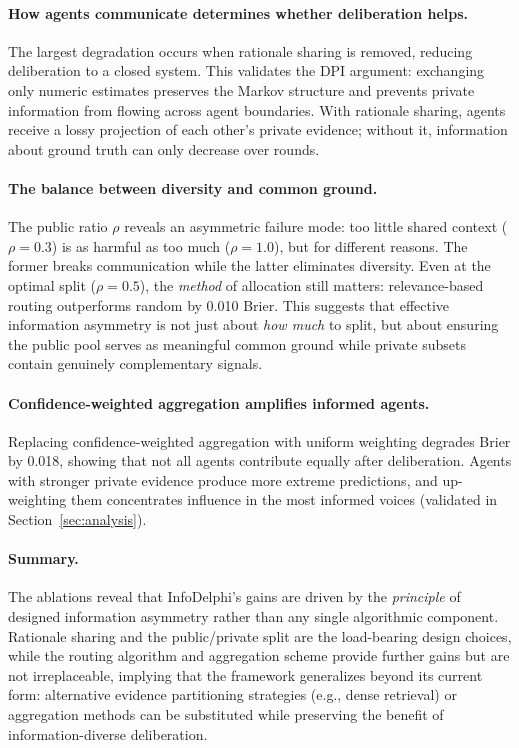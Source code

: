 \documentclass[11pt]{article}
\theoremstyle{plain}
\theoremstyle{definition}
\begin{document}
\paragraph{ How agents communicate determines whether deliberation helps.}
The largest degradation occurs when rationale sharing is removed, reducing deliberation to a closed system.
This validates the DPI argument: exchanging only numeric estimates preserves the Markov structure and prevents private information from flowing across agent boundaries.
With rationale sharing, agents receive a lossy projection of each other's private evidence; without it, information about ground truth can only decrease over rounds.

\paragraph{ The balance between diversity and common ground.}
The public ratio $\rho$ reveals an asymmetric failure mode: too little shared context ($\rho{=}0.3$) is as harmful as too much ($\rho{=}1.0$), but for different reasons. The former breaks communication while the latter eliminates diversity.
Even at the optimal split ($\rho{=}0.5$), the \textit{method} of allocation still matters: relevance-based routing outperforms random by 0.010 Brier.
This suggests that effective information asymmetry is not just about \textit{how much} to split, but about ensuring the public pool serves as meaningful common ground while private subsets contain genuinely complementary signals.

\paragraph{ Confidence-weighted aggregation amplifies informed agents.}
Replacing confidence-weighted aggregation with uniform weighting degrades Brier by 0.018, showing that not all agents contribute equally after deliberation.
Agents with stronger private evidence produce more extreme predictions, and up-weighting them concentrates influence in the most informed voices (validated in Section~\ref{sec:analysis}).

\paragraph{ Summary.}
The ablations reveal that InfoDelphi's gains are driven by the \textit{principle} of designed information asymmetry rather than any single algorithmic component.
Rationale sharing and the public/private split are the load-bearing design choices, while the routing algorithm and aggregation scheme provide further gains but are not irreplaceable, implying that the framework generalizes beyond its current form: alternative evidence partitioning strategies (e.g., dense retrieval) or aggregation methods can be substituted while preserving the benefit of information-diverse deliberation.
\end{document}
